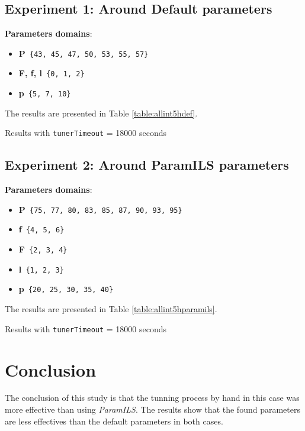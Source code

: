 \subsection{Experiment 1: Around Default parameters}

{\bf Parameters domains}:

\begin{itemize}[itemsep=0.2mm]
	\item {\bf P}\texttt{ \{43, 45, 47, 50, 53, 55, 57\}}
	\item {\bf F, f, l}\texttt{ \{0, 1, 2\}}
	\item {\bf p}\texttt{ \{5, 7, 10\}}
\end{itemize}

The results are presented in Table \ref{table:allint5hdef}.

\begin{table}[H] 
\caption{Results with \texttt{tunerTimeout} = 18000 seconds}
\centering 
\renewcommand{\arraystretch}{1.2}
\label{table:allint5hdef}
\end{table}

\subsection{ Experiment 2: Around ParamILS parameters}

{\bf Parameters domains}:

\begin{itemize}[itemsep=0.2mm]
	\item {\bf P}\texttt{ \{75, 77, 80, 83, 85, 87, 90, 93, 95\}}
	\item {\bf f}\texttt{ \{4, 5, 6\}}
	\item {\bf F}\texttt{ \{2, 3, 4\}}
	\item {\bf l}\texttt{ \{1, 2, 3\}}
	\item {\bf p}\texttt{ \{20, 25, 30, 35, 40\}}
\end{itemize}

The results are presented in Table \ref{table:allint5hparamils}.

\begin{table}[H] 
\caption{Results with \texttt{tunerTimeout} = 18000 seconds}
\centering 
\renewcommand{\arraystretch}{1.2}
\label{table:allint5hparamils}
\end{table}

\section{Conclusion}

The conclusion of this study is that the tunning process by hand in this case was more effective than using {\it ParamILS}. The results show that the found parameters are less effectives than the default parameters in both cases.